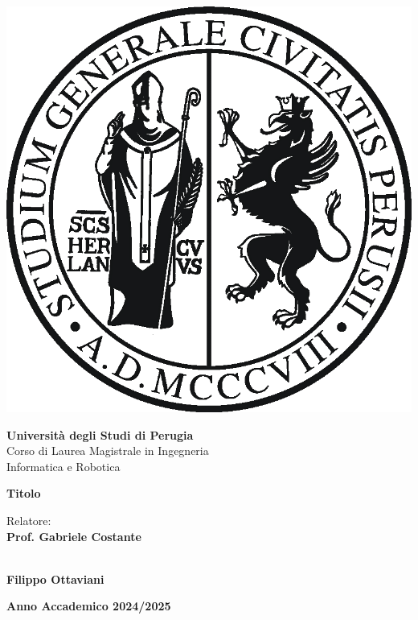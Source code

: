\begin{center}

\includegraphics[width=0.3\linewidth]{immagini/logo-unipg.png} \\
\vspace{0.3cm}

\LARGE \textbf{Università degli Studi di Perugia} \\

\Large {Corso di Laurea Magistrale in Ingegneria\\Informatica e Robotica} \\
\vspace{1cm}

\LARGE \textbf{Titolo} \\ 
\vspace{5cm}

\end{center}

\begin{multicols}{2}
\noindent \large{Relatore:} \\
\large{\textbf{Prof. Gabriele Costante}} \\
\vspace{0.3cm}

 \\
\large{\textbf{Filippo Ottaviani}} \\
\end{multicols}
\vspace{1.5cm}

\begin{center}
    \large{\textbf{Anno Accademico 2024/2025}}
\end{center}

